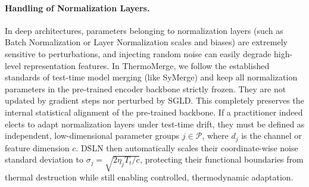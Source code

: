 \paragraph{Handling of Normalization Layers.} In deep architectures, parameters belonging to normalization layers (such as Batch Normalization or Layer Normalization scales and biases) are extremely sensitive to perturbations, and injecting random noise can easily degrade high-level representation features.
In ThermoMerge, we follow the established standards of test-time model merging (like SyMerge) and keep all normalization parameters in the pre-trained encoder backbone strictly frozen.
They are not updated by gradient steps nor perturbed by SGLD.
This completely preserves the internal statistical alignment of the pre-trained backbone.
If a practitioner indeed elects to adapt normalization layers under test-time drift, they must be defined as independent, low-dimensional parameter groups $j \in \mathcal{P}$, where $d_j$ is the channel or feature dimension $c$.
DSLN then automatically scales their coordinate-wise noise standard deviation to $\sigma_j = \sqrt{2 \eta_j T_t / c}$, protecting their functional boundaries from thermal destruction while still enabling controlled, thermodynamic adaptation.

